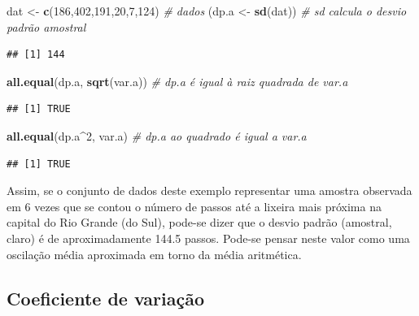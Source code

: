\documentclass[
]{book}
\newenvironment{Shaded}{\begin{snugshade}}{\end{snugshade}}
\newcommand{\CommentTok}[1]{\textcolor[rgb]{0.56,0.35,0.01}{\textit{#1}}}
\newcommand{\DecValTok}[1]{\textcolor[rgb]{0.00,0.00,0.81}{#1}}
\newcommand{\KeywordTok}[1]{\textcolor[rgb]{0.13,0.29,0.53}{\textbf{#1}}}
\newcommand{\NormalTok}[1]{#1}
\newcommand{\OperatorTok}[1]{\textcolor[rgb]{0.81,0.36,0.00}{\textbf{#1}}}
\newcommand{\StringTok}[1]{\textcolor[rgb]{0.31,0.60,0.02}{#1}}
\theoremstyle{definition}
\theoremstyle{definition}
\theoremstyle{definition}
\theoremstyle{remark}
\begin{document}
\begin{Shaded}
\begin{Highlighting}[]
\NormalTok{dat \textless{}{-}}\StringTok{ }\KeywordTok{c}\NormalTok{(}\DecValTok{186}\NormalTok{,}\DecValTok{402}\NormalTok{,}\DecValTok{191}\NormalTok{,}\DecValTok{20}\NormalTok{,}\DecValTok{7}\NormalTok{,}\DecValTok{124}\NormalTok{)    }\CommentTok{\# dados}
\NormalTok{(dp.a \textless{}{-}}\StringTok{ }\KeywordTok{sd}\NormalTok{(dat))                 }\CommentTok{\# \textquotesingle{}sd\textquotesingle{} calcula o desvio padrão amostral}
\end{Highlighting}
\end{Shaded}

\begin{verbatim}
## [1] 144
\end{verbatim}

\begin{Shaded}
\begin{Highlighting}[]
\KeywordTok{all.equal}\NormalTok{(dp.a, }\KeywordTok{sqrt}\NormalTok{(var.a))      }\CommentTok{\# \textquotesingle{}dp.a\textquotesingle{} é igual à raiz quadrada de \textquotesingle{}var.a\textquotesingle{}}
\end{Highlighting}
\end{Shaded}

\begin{verbatim}
## [1] TRUE
\end{verbatim}

\begin{Shaded}
\begin{Highlighting}[]
\KeywordTok{all.equal}\NormalTok{(dp.a}\OperatorTok{\^{}}\DecValTok{2}\NormalTok{, var.a)          }\CommentTok{\# \textquotesingle{}dp.a\textquotesingle{} ao quadrado é igual a \textquotesingle{}var.a\textquotesingle{}}
\end{Highlighting}
\end{Shaded}

\begin{verbatim}
## [1] TRUE
\end{verbatim}

Assim, se o conjunto de dados deste exemplo representar uma amostra observada em 6 vezes que se contou o número de passos até a lixeira mais próxima na capital do Rio Grande (do Sul), pode-se dizer que o desvio padrão (amostral, claro) é de aproximadamente 144.5 passos. Pode-se pensar neste valor como uma oscilação média aproximada em torno da média aritmética.

\hypertarget{coeficiente-de-variauxe7uxe3o}{%
\subsection{Coeficiente de variação}\label{coeficiente-de-variauxe7uxe3o}}
\end{document}
